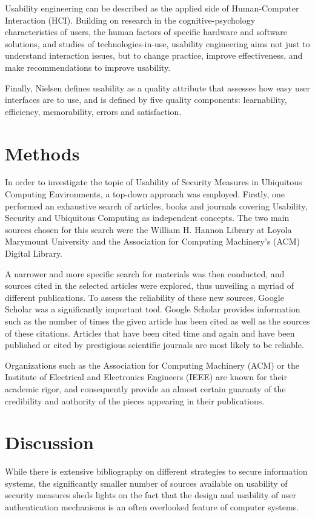 \documentclass{article}
\begin{document}
Usability engineering can be described as the applied side of Human-Computer Interaction (HCI). Building on research in the cognitive-psychology characteristics of users, the human factors of specific hardware and software solutions, and studies of technologies-in-use, usability engineering aims not just to understand interaction issues, but to change practice, improve effectiveness, and make recommendations to improve usability.  

Finally, Nielsen \cite{nielsenusability2012} defines usability as a quality attribute that assesses how easy user interfaces are to use, and is defined by five quality components: learnability, efficiency, memorability, errors and satisfaction. 

\section{Methods}
In order to investigate the topic of Usability of Security Measures in Ubiquitous Computing Environments, a top-down approach was employed. Firstly, one performed an exhaustive search of articles, books and journals covering Usability, Security and Ubiquitous Computing as independent concepts. The two main sources chosen for this search were the William H. Hannon Library at Loyola Marymount University and the Association for Computing Machinery's (ACM) Digital Library.  

A narrower and more specific search for materials was then conducted, and sources cited in the selected articles were explored, thus unveiling a myriad of different publications. To assess the reliability of these new sources, Google Scholar was a significantly important tool. Google Scholar provides information such as the number of times the given article has been cited as well as the sources of these citations.  Articles that have been cited time and again and have been published or cited by prestigious scientific journals are most likely to be reliable.

Organizations such as the Association for Computing Machinery (ACM) or the Institute of Electrical and Electronics Engineers (IEEE) are known for their academic rigor, and consequently provide an almost certain guaranty of the credibility and authority of the pieces appearing in their publications. 


\section{Discussion}
While there is extensive bibliography on different strategies to secure information systems, the significantly smaller number of sources available on usability of security measures sheds lights on the fact that the design and usability of user authentication mechanisms is an often overlooked feature of computer systems.
\end{document}
